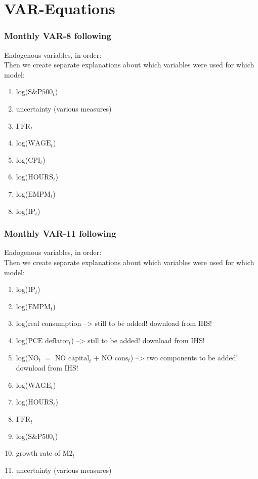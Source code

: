\documentclass[a4paper,11pt,listof=nochaptergap,oneside,pointednumbers,bibtotoc,bigheadings,liststotoc]{scrbook}
\theoremstyle{mysatz}
\theoremstyle{mydefinition}
\theoremstyle{mytheorem}
\theoremstyle{mybemerkung}
\renewcommand*{\paragraph}[1]{\subsubsection*{#1} \vspace{-3mm}} %
\begin{document}
\section{VAR-Equations}
\paragraph{Monthly VAR-8 following \citet{bloom:09}} Endogenous variables, in order:\\
Then we create separate explanations about which variables were used for which model:\\

\begingroup
\begin{spacing}{0.5}
    \fontsize{10pt}{12pt}\selectfont
\begin{enumerate}
	\item log($\text{S\&P500}_t$)
	\item uncertainty (various measures)
	\item $\text{FFR}_t$
	\item log($\text{WAGE}_t$)
	\item log($\text{CPI}_t$)
	\item log($\text{HOURS}_t$)
	\item log($\text{EMPM}_t$)	
	\item log($\text{IP}_t$)		
\end{enumerate}
\end{spacing}
\endgroup



\paragraph{Monthly VAR-11 following \citet{juradoetal:15}} Endogenous variables, in order:\\
Then we create separate explanations about which variables were used for which model:\\

\begingroup
\begin{spacing}{0.5}
    \fontsize{10pt}{12pt}\selectfont
\begin{enumerate}
	\item log($\text{IP}_t$)
	\item log($\text{EMPM}_t$)
	\item log(real consumption --> still to be added! download from IHS!
	\item log($\text{PCE deflator}_t$) --> still to be added! download from IHS!
	\item log($\text{NO}_t$ $=$ $\text{NO capital}_t$ $+$ $\text{NO cons}_t$) --> two components to be added! download from IHS!
	\item log($\text{WAGE}_t$)
	\item log($\text{HOURS}_t$)
	\item $\text{FFR}_t$
	\item log($\text{S\&P500}_t$)
	\item growth rate of $\text{M2}_t$
	\item uncertainty (various measures)
\end{enumerate}
\end{spacing}
\endgroup
\end{document}
